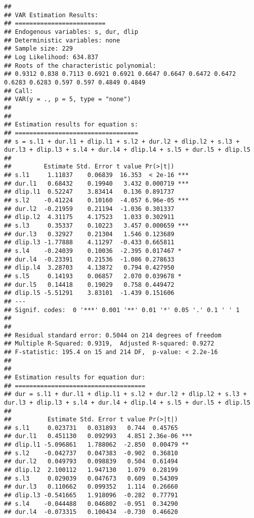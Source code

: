 \documentclass[]{article}
\begin{document}
\begin{verbatim}
## 
## VAR Estimation Results:
## ========================= 
## Endogenous variables: s, dur, dlip 
## Deterministic variables: none 
## Sample size: 229 
## Log Likelihood: 634.837 
## Roots of the characteristic polynomial:
## 0.9312 0.838 0.7113 0.6921 0.6921 0.6647 0.6647 0.6472 0.6472 0.6283 0.6283 0.597 0.597 0.4849 0.4849
## Call:
## VAR(y = ., p = 5, type = "none")
## 
## 
## Estimation results for equation s: 
## ================================== 
## s = s.l1 + dur.l1 + dlip.l1 + s.l2 + dur.l2 + dlip.l2 + s.l3 + dur.l3 + dlip.l3 + s.l4 + dur.l4 + dlip.l4 + s.l5 + dur.l5 + dlip.l5 
## 
##         Estimate Std. Error t value Pr(>|t|)    
## s.l1     1.11837    0.06839  16.353  < 2e-16 ***
## dur.l1   0.68432    0.19940   3.432 0.000719 ***
## dlip.l1  0.52247    3.83414   0.136 0.891737    
## s.l2    -0.41224    0.10160  -4.057 6.96e-05 ***
## dur.l2  -0.21959    0.21194  -1.036 0.301337    
## dlip.l2  4.31175    4.17523   1.033 0.302911    
## s.l3     0.35337    0.10223   3.457 0.000659 ***
## dur.l3   0.32927    0.21304   1.546 0.123689    
## dlip.l3 -1.77888    4.11297  -0.433 0.665811    
## s.l4    -0.24039    0.10036  -2.395 0.017467 *  
## dur.l4  -0.23391    0.21536  -1.086 0.278633    
## dlip.l4  3.28703    4.13872   0.794 0.427950    
## s.l5     0.14193    0.06857   2.070 0.039678 *  
## dur.l5   0.14418    0.19029   0.758 0.449472    
## dlip.l5 -5.51291    3.83101  -1.439 0.151606    
## ---
## Signif. codes:  0 '***' 0.001 '**' 0.01 '*' 0.05 '.' 0.1 ' ' 1
## 
## 
## Residual standard error: 0.5044 on 214 degrees of freedom
## Multiple R-Squared: 0.9319,  Adjusted R-squared: 0.9272 
## F-statistic: 195.4 on 15 and 214 DF,  p-value: < 2.2e-16 
## 
## 
## Estimation results for equation dur: 
## ==================================== 
## dur = s.l1 + dur.l1 + dlip.l1 + s.l2 + dur.l2 + dlip.l2 + s.l3 + dur.l3 + dlip.l3 + s.l4 + dur.l4 + dlip.l4 + s.l5 + dur.l5 + dlip.l5 
## 
##          Estimate Std. Error t value Pr(>|t|)    
## s.l1     0.023731   0.031893   0.744  0.45765    
## dur.l1   0.451130   0.092993   4.851 2.36e-06 ***
## dlip.l1 -5.096861   1.788062  -2.850  0.00479 ** 
## s.l2    -0.042737   0.047383  -0.902  0.36810    
## dur.l2   0.049793   0.098839   0.504  0.61494    
## dlip.l2  2.100112   1.947130   1.079  0.28199    
## s.l3     0.029039   0.047673   0.609  0.54309    
## dur.l3   0.110662   0.099352   1.114  0.26660    
## dlip.l3 -0.541665   1.918096  -0.282  0.77791    
## s.l4    -0.044488   0.046802  -0.951  0.34290    
## dur.l4  -0.073315   0.100434  -0.730  0.46620    

\end{verbatim}
\end{document}
